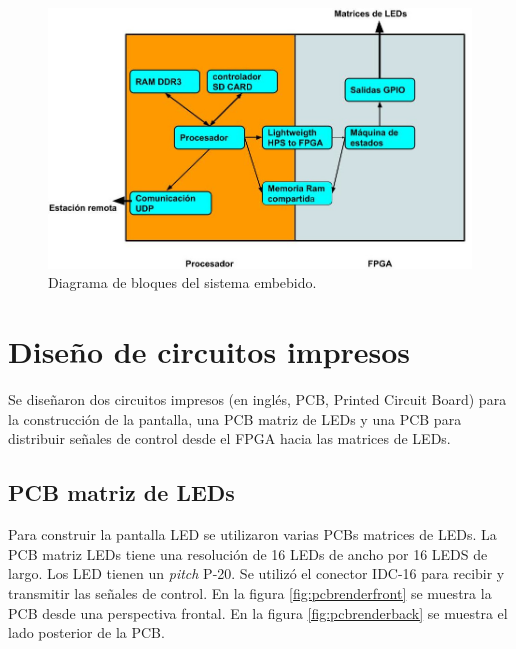 \begin{figure}[htpb]
	\centering
	\includegraphics[scale=1.8]{Figures/Diagramabloques.jpg} 
	\caption{Diagrama de bloques del sistema embebido.}
	\label{fig:bloques embebido}
\end{figure}






\section{ Diseño de circuitos impresos}
Se diseñaron dos circuitos impresos (en inglés, PCB, Printed Circuit Board) para la construcción de la pantalla, una PCB matriz de LEDs y una PCB para distribuir señales de control desde el FPGA hacia las matrices de LEDs.
\subsection{PCB matriz de LEDs}
Para construir la pantalla LED se utilizaron varias PCBs matrices de LEDs. La PCB matriz LEDs tiene una resolución de 16 LEDs de ancho por 16 LEDS de largo. Los LED tienen un \textit{pitch} P-20. Se utilizó el conector IDC-16 para recibir y transmitir las señales de control. En la figura \ref{fig:pcbrenderfront}  se muestra la PCB desde una perspectiva frontal. En la figura \ref{fig:pcbrenderback} se muestra el lado posterior de la PCB.


